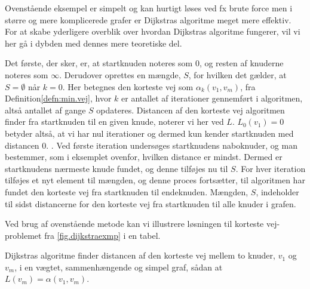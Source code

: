 Ovenstående eksempel er simpelt og kan hurtigt løses ved fx brute force men i større og mere komplicerede grafer er Dijkstras algoritme meget mere effektiv. For at skabe yderligere overblik over hvordan Dijkstras algoritme fungerer, vil vi her gå i dybden med dennes mere teoretiske del.

Det første, der sker, er, at startknuden noteres som $0$, og resten af knuderne noteres som $\infty$. Derudover oprettes en mængde, $S$, for hvilken det gælder, at $S = \emptyset$ når $k = 0$. Her betegnes den korteste vej som $\alpha_{k}(v_1,v_m)$, fra Definition\ref{defn:min.vej}, hvor $k$ er antallet af iterationer gennemført i algoritmen, altså antallet af gange $S$ opdateres. Distancen af den korteste vej algoritmen finder fra startknuden til en given knude, noterer vi her ved $L$. $L_{0}(v_1)=0$ betyder altså, at vi har nul iterationer og dermed kun kender startknuden med distancen $0$. . Ved første iteration undersøges startknudens naboknuder, og man bestemmer, som i eksemplet ovenfor, hvilken distance er mindst. Dermed er startknudens nærmeste knude fundet, og denne tilføjes nu til $S$. For hver iteration tilføjes et nyt element til mængden, og denne proces fortsætter, til algoritmen har fundet den korteste vej fra startknuden til endeknuden. Mængden, $S$, indeholder til sidst distancerne for den korteste vej fra startknuden til alle knuder i grafen. 

Ved brug af ovenstående metode kan vi illustrere løsningen til korteste vej-problemet fra \autoref{fig.dijkstraexmp} i en tabel.



\begin{thm} \label{thm:dijkstra}
Dijkstras algoritme finder distancen af den korteste vej mellem to knuder, $v_1$ og $v_m$, i en vægtet, sammenhængende og simpel graf, sådan at $L(v_m)=\alpha(v_1,v_m)$. 
\end{thm}

